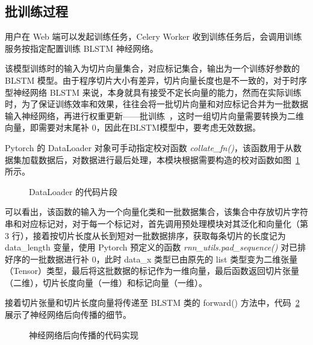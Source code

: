 \subsection{批训练过程}

用户在 Web 端可以发起训练任务，Celery Worker 收到训练任务后，会调用训练服务按指定配置训练 BLSTM 神经网络。

该模型训练时的输入为切片向量集合，对应标记集合，输出为一个训练好参数的 BLSTM 模型。由于程序切片大小有差异，切片向量长度也是不一致的，对于时序型神经网络 BLSTM 来说，本身就具有接受不定长向量的能力，然而在实际训练时，为了保证训练效率和效果，往往会将一批切片向量和对应标记合并为一批数据输入神经网络，再进行权重更新——批训练~\cite{imageNet,trainLonger,largeBatchLSTM}，这时一组切片向量需要转换为二维向量，即需要对末尾补 0，因此在BLSTM模型中，要考虑无效数据。

Pytorch 的 DataLoader 对象可手动指定校对函数 \textit{collate\_fn()}，该函数用于从数据集加载数据后，对数据进行最后处理，本模块根据需要构造的校对函数如图~\ref{code:collateFn} 所示。

\begin{figure}[htbp]
    \centering
    \begin{minipage}{0.9\textwidth}
        
    \end{minipage}
    \caption{DataLoader 的代码片段}\label{code:collateFn}
\end{figure}

可以看出，该函数的输入为一个向量化类和一批数据集合，该集合中存放切片字符串和对应标记对，对于每一个标记对，首先调用预处理模块对其泛化和向量化（第 3 行），接着按切片长度从长到短对一批数据排序，获取每条切片的长度记为 data\_length 变量，使用 Pytorch 预定义的函数 \textit{rnn\_utils.pad\_sequence()} 对已排好序的一批数据进行补 0，此时 data\_x 类型已由原先的 list 类型变为二维张量（Tensor）类型，最后将这批数据的标记作为一维向量，最后函数返回切片张量（二维），切片长度向量（一维）和标记向量（一维）。

接着切片张量和切片长度向量将传递至 BLSTM 类的 forward() 方法中，代码~\ref{code:blstm} 展示了神经网络后向传播的细节。

\begin{figure}[htbp]
    \centering
    \begin{minipage}{0.9\textwidth}
        
    \end{minipage}
    \caption{神经网络后向传播的代码实现}\label{code:blstm}
\end{figure}


